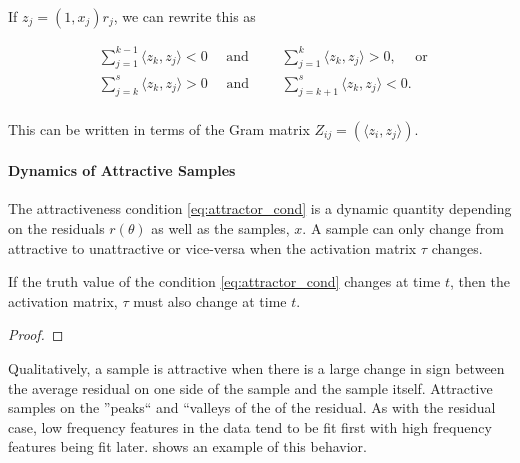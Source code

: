 If $z_j = (1,x_j) r_j$, we can rewrite this as

\begin{equation}
\begin{aligned}\label{eq:attractor_cond}
    &\sum_{j=1}^{k-1} \langle z_k , z_j \rangle < 0 \quad \mbox{ and } \qquad \sum_{j=1}^{k} \langle z_k, z_j \rangle > 0, \quad \mbox{ or }\\
    &\sum_{j=k}^{s} \langle z_k , z_j \rangle > 0 \quad \mbox{ and } \qquad \sum_{j=k+1}^{s} \langle z_k, z_j \rangle < 0.\\
\end{aligned}
\end{equation}


This can be written in terms of the Gram matrix $Z_{ij} = (\langle z_i, z_j\rangle)$.

\paragraph{Dynamics of Attractive Samples}

The attractiveness condition \eqref{eq:attractor_cond} is a dynamic quantity depending on the residuals $r(\theta)$ as well as the samples, $x$. A sample can only change from attractive to unattractive or vice-versa when the activation matrix $\tau$ changes.

\begin{lemma}
If the truth value of the condition \eqref{eq:attractor_cond} changes at time $t$, then the activation matrix, $\tau$ must also change at time $t$.
\end{lemma}
\begin{proof}
\end{proof}

Qualitatively, a sample is attractive when there is a large change in sign between the average residual on one side of the sample and the sample itself. Attractive samples on the ''peaks`` and ``valleys of the of the residual. As with the residual case, low frequency features in the data tend to be fit first with high frequency features being fit later.  shows an example of this behavior.



























